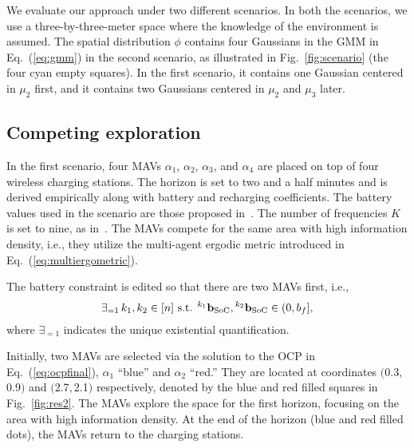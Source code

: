 \documentclass[letterpaper,10pt,conference,twoside]{IEEEtran}
\theoremstyle{definition}
\begin{document}
We evaluate our approach under two different scenarios. In both the scenarios, we use a three-by-three-meter space where the knowledge of the environment is assumed. The spatial distribution $\phi$ contains four Gaussians in the GMM in Eq.~(\ref{eq:gmm}) in the second scenario, as illustrated in Fig.~\ref{fig:scenario} (the four cyan empty squares). In the first scenario, it contains one Gaussian centered in $\mu_2$ first, and it contains two Gaussians centered in $\mu_2$ and $\mu_3$ later.

\subsection*{Competing exploration}
\noindent
In the first scenario, four MAVs $\alpha_1$, $\alpha_2$, $\alpha_3$, and $\alpha_4$ are placed on top of four wireless charging stations. %
The horizon is set to two and a half minutes and is derived empirically along with battery and recharging coefficients. The battery values used in the scenario are those proposed in~\cite{zhao2017observability}. The number of frequencies $K$ is set to nine, as in~\cite{calinon2020mixture}. %
The MAVs compete for the same area with high information density, i.e., they utilize the multi-agent ergodic metric introduced in Eq.~(\ref{eq:multiergometric}).

The battery constraint is edited so that there are two MAVs first, i.e.,\vspace*{-.15cm}
\begin{equation}
\exists_{=1}\, k_1,k_2\in[n]\text{ s.t. }{}^{k_1} \mathbf{b}_{\text{SoC}},{}^{k_2} \mathbf{b}_{\text{SoC}}\in(0,b_f],\vspace*{-.1cm}
\end{equation} 
where %
$\exists_{=1}$ indicates the unique existential quantification.

Initially, two MAVs are selected via the solution to the OCP in Eq.~(\ref{eq:ocpfinal}), $\alpha_1$ ``blue'' and $\alpha_2$ ``red.'' They are located at coordinates $($0.3$,$0.9$)$ and $($2.7$,$2.1$)$ respectively, denoted by the blue and red filled squares in Fig.~\ref{fig:res2}. The MAVs explore the space for the first horizon, focusing on the area with high information density. At the end of the horizon (blue and red filled dots), the MAVs return to the charging stations. %
\end{document}
